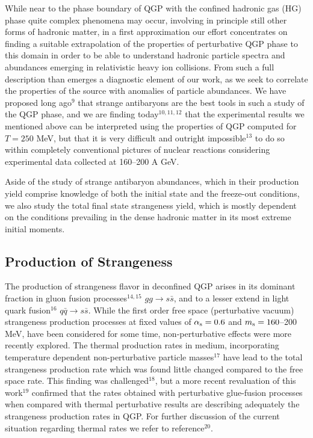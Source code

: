 \begin{mdframed}[linecolor=gray,roundcorner=12pt,backgroundcolor=Dandelion!15,linewidth=1pt,leftmargin=0cm,rightmargin=0cm,topline=true,bottomline=true,skipabove=12pt]
While near to the phase boundary of QGP with the confined hadronic gas (HG) phase quite complex phenomena may occur, involving in principle still other forms of hadronic matter, in a first approximation our effort  concentrates  on finding a suitable  extrapolation of the properties of perturbative QGP phase to this domain in order to be able to understand hadronic particle spectra  and abundances emerging in relativistic heavy ion collisions. From such a full description than emerges a diagnostic element of our work, as we seek to  correlate the properties of the source with  anomalies of particle abundances. We have proposed long ago$^{9}$ that strange antibaryons are the best tools in such a study of the QGP phase, and we are finding today$^{10,11,12}$ that the experimental results we mentioned above can be  interpreted using the properties of QGP computed for $T=250$ MeV, but that it is very difficult and outright impossible$^{13}$   to do so within completely conventional  pictures  of  nuclear reactions considering experimental data collected at 160--200 A GeV.

Aside of the study of strange antibaryon abundances, which in their production yield comprise knowledge of both the initial state and the freeze-out conditions, we also study the total final state strangeness yield, which is mostly dependent on the conditions prevailing in the dense hadronic matter in its most extreme initial moments. 

\subsection*{Production of Strangeness}
The production of strangeness flavor in deconfined QGP arises in its dominant fraction in gluon fusion processes$^{14,15}$ $gg\to s\bar s$,  and to a lesser extend in light quark fusion$^{16}$  $ q\bar q\to s\bar s$. While the first order free space (perturbative vacuum) strangeness production processes at fixed values of $\alpha_{\rm s}=0.6$ and $m_{\rm s}= 160$--200 MeV, have been considered for some time, non-perturbative effects were more recently explored. The thermal production rates in medium, incorporating temperature dependent non-perturbative particle masses$^{17}$  have lead to the total strangeness production rate which was found little changed compared to the free space rate. This finding was challenged$^{18}$, but a more recent revaluation of this work$^{19}$ confirmed that the rates obtained with perturbative glue-fusion processes when compared with thermal perturbative results are describing adequately the strangeness production rates in QGP. For further discussion of the current situation regarding thermal rates we refer  to reference$^{20}$.


\end{mdframed}
